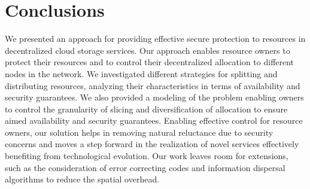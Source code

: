 \section{Conclusions}\label{dcs:sec:conclusion}

We presented an approach for providing effective secure protection to
resources in decentralized cloud storage services.  Our approach
enables resource owners to protect their resources and to control
their decentralized allocation to different nodes in the network. We
investigated different strategies for splitting and distributing
resources, analyzing their characteristics in terms of availability
and security guarantees. We also provided a modeling of the problem
enabling owners to control the granularity of slicing and
diversification of allocation to ensure aimed availability and
security guarantees. Enabling effective control for resource owners,
our solution helps in removing natural reluctance due to security
concerns and moves a step forward in the realization of novel services
effectively benefiting from technological evolution. Our work
  leaves room for extensions, such as the consideration of error
  correcting codes and information dispersal algorithms to reduce the
  spatial overhead.
